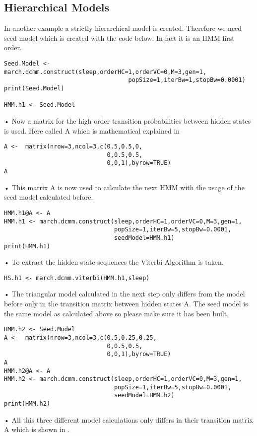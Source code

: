 \subsection{Hierarchical Models}
In another example a strictly hierarchical model is created. Therefore we need seed model which is created with the code below. In fact it is an HMM first order. 
\begin{verbatim}
Seed.Model <- march.dcmm.construct(sleep,orderHC=1,orderVC=0,M=3,gen=1,
                                   popSize=1,iterBw=1,stopBw=0.0001)
print(Seed.Model)

HMM.h1 <- Seed.Model
\end{verbatim}•
Now a matrix for the high order transition probabilities between hidden states is used. Here called A  which is mathematical explained in \cite{Berchtold2002}
\begin{verbatim}
A <-  matrix(nrow=3,ncol=3,c(0.5,0.5,0,
                             0,0.5,0.5,
                             0,0,1),byrow=TRUE)
A
\end{verbatim}•
This matrix A is now used to calculate the next HMM with the usage of the seed model calculated before. 
\begin{verbatim}
HMM.h1@A <- A             
HMM.h1 <- march.dcmm.construct(sleep,orderHC=1,orderVC=0,M=3,gen=1,
                               popSize=1,iterBw=5,stopBw=0.0001,
                               seedModel=HMM.h1)
print(HMM.h1)
\end{verbatim}•
To extract the hidden state sequences the Viterbi Algorithm is taken. 
\begin{verbatim}
HS.h1 <- march.dcmm.viterbi(HMM.h1,sleep)
\end{verbatim}•
The triangular model calculated in the next step only differs from the model before only in the transition matrix between hidden states A. The seed model is the same model as calculated above so please make sure it has been built. 
\begin{verbatim}
HMM.h2 <- Seed.Model
A <-  matrix(nrow=3,ncol=3,c(0.5,0.25,0.25,
                             0,0.5,0.5,
                             0,0,1),byrow=TRUE)
A
HMM.h2@A <- A             
HMM.h2 <- march.dcmm.construct(sleep,orderHC=1,orderVC=0,M=3,gen=1,
                               popSize=1,iterBw=5,stopBw=0.0001,
                               seedModel=HMM.h2)
print(HMM.h2)
\end{verbatim}•
All this three different model calculations only differs in their transition matrix A which is shown in .
